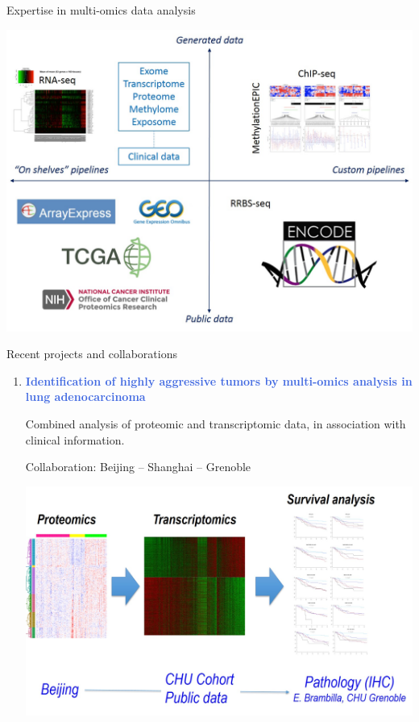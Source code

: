 \documentclass[final]{beamer}
\newlength{\twocolwid}
\begin{document}
\begin{frame}[t]
\begin{columns}[t]
\begin{column}{\twocolwid} %


\begin{block}{Expertise in multi-omics data analysis}

\begin{center}
	\includegraphics[width=\linewidth]{figs/multi_omics_expertise.jpg}
\end{center}

\end{block}


\begin{block}{Recent projects and collaborations}

\begin{enumerate}
	
	\item \textcolor{RoyalBlue}{\textbf{Identification of highly aggressive tumors by multi-omics analysis in lung adenocarcinoma}}

	Combined analysis of proteomic and transcriptomic data, in association with clinical information.
	
Collaboration: Beijing -- Shanghai -- Grenoble


\begin{center}
\includegraphics[width=\linewidth]{figs/proteomics_transcriptomics}
\end{center}


\end{enumerate}
\end{block}
\end{column}
\end{columns}
\end{frame}
\end{document}
